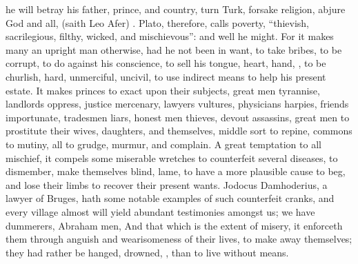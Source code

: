 %
he will betray his father, prince, and country, turn Turk, forsake religion,
abjure God and all, 
(saith Leo Afer) .
Plato, therefore, calls poverty, \enquote{thievish, sacrilegious,
filthy, wicked, and mischievous}: and well he might. For it makes many an
upright man otherwise, had he not been in want, to take bribes, to be corrupt,
to do against his conscience, to sell his tongue, heart, hand, \etc{}, to be
churlish, hard, unmerciful, uncivil, to use indirect means to help his present
estate. It makes princes to exact upon their subjects, great men tyrannise,
landlords oppress, justice mercenary, lawyers vultures, physicians harpies,
friends importunate, tradesmen liars, honest men thieves, devout assassins,
great men to prostitute their wives, daughters, and themselves, middle sort to
repine, commons to mutiny, all to grudge, murmur, and complain. A great
temptation to all mischief, it compels some miserable wretches to counterfeit
several diseases, to dismember, make themselves blind, lame, to have a more
plausible cause to beg, and lose their limbs to recover their present wants.
Jodocus Damhoderius, a lawyer of Bruges,  hath some notable examples of such counterfeit cranks, and
every village almost will yield abundant testimonies amongst us; we have
dummerers, Abraham men, \etc{} And that which is the extent of misery, it
enforceth them through anguish and wearisomeness of their lives, to make away
themselves; they had rather be hanged, drowned, \etc{}, than to live without
means.


